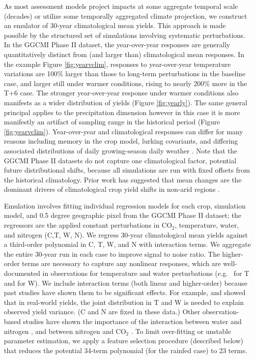 \documentclass[gmd, manuscript]{copernicus} %
\begin{document}
As most assessment models project impacts at some aggregate temporal scale (decades) or utilize some temporally aggregated climate projection, we construct an emulator of 30-year climatological mean yields. 
This approach is made possible by the structured set of simulations involving systematic perturbations. 
In the GGCMI Phase II dataset, the year-over-year responses are generally quantitatively distinct from (and larger than) climatological mean responses. 
In the example Figure \ref{fig:yearvclim}, responses to year-over-year temperature variations are 100\% larger than those to long-term perturbations in the baseline case, and larger still under warmer conditions, rising to nearly 200\% more in the T+6 case. 
The stronger year-over-year response under warmer conditions also manifests as a wider distribution of yields (Figure \ref{fig:yearly}).
The same general principal applies to the precipitation dimension however in this case it is more manifestly an artifact of sampling range in the historical period (Figure \ref{fig:yearvclim}).
Year-over-year and climatological responses can differ for many reasons including memory in the crop model, lurking covariants, and differing associated distributions of daily growing-season daily weather \citep[e.g.][]{Ruane2016}. 
Note that the GGCMI Phase II datasets do not capture one climatological factor, potential future distributional shifts, because all simulations are run with fixed offsets from the historical climatology. 
Prior work has suggested that mean changes are the dominant drivers of climatological crop yield shifts in non-arid regions \citep[e.g.][]{Glotter14}. 

Emulation involves fitting individual regression models for each crop, simulation model, and 0.5 degree geographic pixel from the GGCMI Phase II dataset; the regressors are the applied constant perturbations in CO$_2$, temperature, water, and nitrogen (C,T, W, N).  
We regress 30-year climatological mean yields against a third-order polynomial in C, T, W, and N with interaction terms. 
We aggregate the entire 30-year run in each case to improve signal to noise ratio. 
The higher-order terms are necessary to capture any nonlinear responses, which are well-documented in observations for temperature and water perturbations (e.g.\ \citet{Schlenker2009} for T and \citet{He2016} for W). 
We include interaction terms (both linear and higher-order) because past studies have shown them to be significant effects. 
For example, \citet{Lobell2007} and \citet{Tebaldi2008} showed that in real-world yields, the joint distribution in T and W is needed to explain observed yield variance. 
(C and N are fixed in these data.) 
Other observation-based studies have shown the importance of the interaction between water and nitrogen \citep[e.g.][]{AULAKH2005}, and between nitrogen and CO$_2$ \citep{Mitsuru92, Nakamura97}. 
To limit over-fitting or unstable parameter estimation, we apply a feature selection procedure (described below) that reduces the potential 34-term polynomial (for the rainfed case) to 23 terms.
\end{document}
